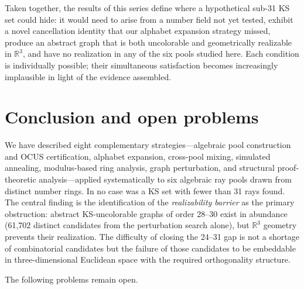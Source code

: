 \documentclass[twocolumn,pra,superscriptaddress,nofootinbib]{revtex4-2}
\newcommand{\R}{\mathbb{R}}
\begin{document}
Taken together, the results of this series define where a hypothetical sub-31
KS set could hide: it would need to arise from a number field not yet tested,
exhibit a novel cancellation identity that our alphabet expansion strategy missed,
produce an abstract graph that is both uncolorable and geometrically realizable
in $\R^3$, and have no realization in any of the six pools studied here.
Each condition is individually possible; their simultaneous satisfaction becomes
increasingly implausible in light of the evidence assembled.

\section{Conclusion and open problems}
\label{sec:conclusion}

We have described eight complementary strategies---algebraic pool construction
and OCUS certification, alphabet expansion, cross-pool mixing, simulated
annealing, modulus-based ring analysis, graph perturbation, and structural
proof-theoretic analysis---applied systematically to six algebraic ray pools
drawn from distinct number rings. In no case was a KS set with fewer than 31
rays found. The central finding is the identification of the \emph{realizability
barrier} as the primary obstruction: abstract KS-uncolorable graphs of order
28--30 exist in abundance (61,702 distinct candidates from the perturbation
search alone), but $\R^3$ geometry prevents their realization. The difficulty
of closing the 24--31 gap is not a shortage of combinatorial candidates but
the failure of those candidates to be embeddable in three-dimensional Euclidean
space with the required orthogonality structure.

The following problems remain open.
\end{document}
